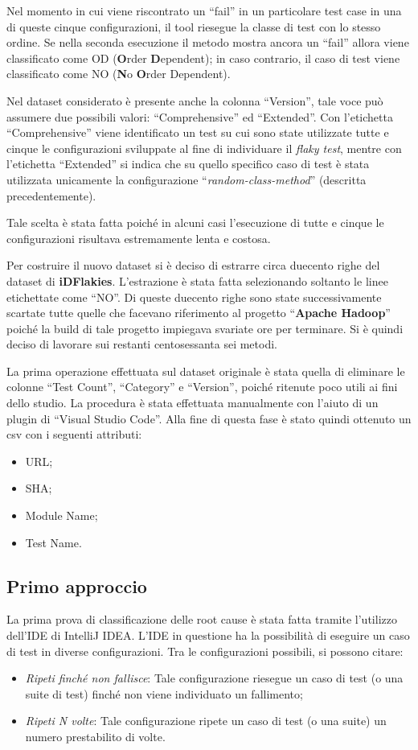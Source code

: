 Nel momento in cui viene riscontrato un “fail” in un particolare test case in una di queste cinque configurazioni, il tool riesegue la classe di test con lo stesso ordine. Se nella seconda esecuzione il metodo mostra ancora un “fail” allora
viene classificato come OD (\textbf{O}rder \textbf{D}ependent); in caso contrario, il caso di test
viene classificato come NO (\textbf{N}o \textbf{O}rder Dependent).

Nel dataset considerato è presente anche la colonna “Version”, tale voce può assumere due possibili valori: “Comprehensive” ed “Extended”. Con l’etichetta “Comprehensive” viene identificato un test su cui sono state utilizzate tutte e cinque
le configurazioni sviluppate al fine di individuare il \emph{flaky test}, mentre con l’etichetta “Extended” si indica che su quello specifico caso di test è stata utilizzata
unicamente la configurazione “\emph{random-class-method}” (descritta precedentemente).

Tale scelta è stata fatta poiché in alcuni casi l’esecuzione di tutte e cinque le configurazioni risultava estremamente lenta e costosa.

Per costruire il nuovo dataset si è deciso di estrarre circa duecento righe del dataset di \textbf{iDFlakies}. L’estrazione è stata fatta selezionando soltanto le linee etichettate come “NO”. Di queste duecento righe sono state successivamente
scartate tutte quelle che facevano riferimento al progetto “\textbf{Apache Hadoop}” poiché la build di tale progetto impiegava svariate ore per terminare. Si è quindi deciso di lavorare sui restanti centosessanta sei metodi.

La prima operazione effettuata sul dataset originale è stata quella di eliminare le colonne “Test Count”, “Category” e “Version”, poiché ritenute poco utili ai fini dello studio. La procedura è stata effettuata manualmente con l’aiuto di un plugin di “Visual Studio Code”. Alla fine di questa fase è stato quindi ottenuto un csv con i seguenti attributi:
\begin{itemize}
	\item URL;
	\item SHA;
	\item Module Name;
	\item Test Name.
\end{itemize}
\subsection{Primo approccio}
La prima prova di classificazione delle root cause è stata fatta tramite
l’utilizzo dell’IDE di IntelliJ IDEA. L’IDE in questione ha la possibilità di eseguire un caso di test in diverse configurazioni. Tra le configurazioni possibili, si possono citare:
\begin{itemize}
\item \emph{Ripeti finché non fallisce}: Tale configurazione riesegue un caso di test (o una suite di test) finché non viene individuato un fallimento;
\item \emph{Ripeti N volte}: Tale configurazione ripete un caso di test (o una suite) un numero prestabilito di volte.
\end{itemize}

